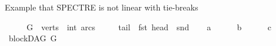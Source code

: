 \begin{isabellebody}
\begin{isamarkuptext}%
%
\end{isamarkuptext}\isamarkuptrue%
%
\endisatagproof
{\isafoldproof}%
%
\isadelimproof
%
\endisadelimproof
{}\isamarkupfalse%
%
\begin{isamarkuptext}%
Example that SPECTRE is not linear with tie-breaks%
\end{isamarkuptext}\isamarkuptrue%
\isamarkupfalse%
\ \isanewline
%
\isadelimproof
\ \ %
\endisadelimproof
%
\isatagproof
{}\isamarkupfalse%
\ {\isacharquery}{\kern0pt}G\ {\isacharequal}{\kern0pt}\ {\isachardoublequoteopen}{\isasymlparr}verts\ {\isacharequal}{\kern0pt}\ {\isacharbraceleft}{\kern0pt}{}{\isacharcolon}{\kern0pt}{\isacharcolon}{\kern0pt}int{\isacharcomma}{\kern0pt}{}{\isacharcomma}{\kern0pt}{}{\isacharcomma}{\kern0pt}{}{\isacharcomma}{\kern0pt}{}{\isacharbraceright}{\kern0pt}{\isacharcomma}{\kern0pt}\ arcs\ {\isacharequal}{\kern0pt}\ {\isacharbraceleft}{\kern0pt}{\isacharparenleft}{\kern0pt}{}{\isacharcomma}{\kern0pt}{}{\isacharparenright}{\kern0pt}{\isacharcomma}{\kern0pt}{\isacharparenleft}{\kern0pt}{}{\isacharcomma}{\kern0pt}{}{\isacharparenright}{\kern0pt}{\isacharcomma}{\kern0pt}{\isacharparenleft}{\kern0pt}{}{\isacharcomma}{\kern0pt}{}{\isacharparenright}{\kern0pt}{\isacharcomma}{\kern0pt}\isanewline
\ \ {\isacharparenleft}{\kern0pt}{}{\isacharcomma}{\kern0pt}{}{\isacharparenright}{\kern0pt}{\isacharbraceright}{\kern0pt}{\isacharcomma}{\kern0pt}\ tail\ {\isacharequal}{\kern0pt}\ fst{\isacharcomma}{\kern0pt}\ head\ {\isacharequal}{\kern0pt}\ snd{\isasymrparr}{\isachardoublequoteclose}\isanewline
\ \ \isamarkupfalse%
\ {\isacharquery}{\kern0pt}a\ {\isacharequal}{\kern0pt}\ {\isachardoublequoteopen}{}{\isachardoublequoteclose}\isanewline
\ \ \isamarkupfalse%
\ {\isacharquery}{\kern0pt}b\ {\isacharequal}{\kern0pt}\ {\isachardoublequoteopen}{}{\isachardoublequoteclose}\isanewline
\ \ \isamarkupfalse%
\ {\isacharquery}{\kern0pt}c\ {\isacharequal}{\kern0pt}\ {\isachardoublequoteopen}{}{\isachardoublequoteclose}\isanewline
\ \ \isamarkupfalse%
\ {\isachardoublequoteopen}blockDAG\ {\isacharquery}{\kern0pt}G{\isachardoublequoteclose}%
\begin{isamarkuptext}%
%
\end{isamarkuptext}\isamarkuptrue%

\end{isabellebody}
